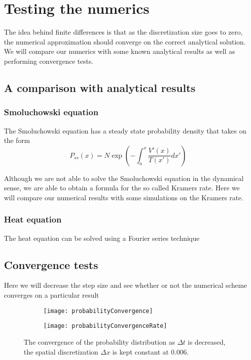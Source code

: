 \chapter{Testing the numerics}

The idea behind finite differences is that as the discretization size goes to zero, the numerical approximation should converge on the correct analytical solution. We will compare our numerics with some known analytical results as well as performing convergence tests.
\section{A comparison with analytical results}
\subsection{Smoluchowski equation}
The Smoluchowski equation has a steady state probability density that takes on the form
\begin{equation}
P_{ss}(x) = N \exp{\left(-\int_a^x \frac{V'(x)}{T(x')} dx' \right)}
\end{equation}

Although we are not able to solve the Smoluchowski equation in the dynamical sense, we are able to obtain a formula for the so called Kramers rate. Here we will compare our numerical results with some simulations on the Kramers rate.

\subsection{Heat equation}
The heat equation can be solved using a Fourier series technique

\section{Convergence tests}
Here we will decrease the step size and see whether or not the numerical scheme converges on a particular result

\begin{figure}
	\begin{subfigure}{0.49\textwidth}
		\texttt{[image: probabilityConvergence]}
	\end{subfigure}
	\begin{subfigure}{0.49\textwidth}
		\texttt{[image: probabilityConvergenceRate]}
	\end{subfigure}
\caption{The convergence of the probability distribution as $\Delta t$ is decreased, the spatial discretization $\Delta x$ is kept constant at 0.006.}
\label{fig:Schematic}
\end{figure}